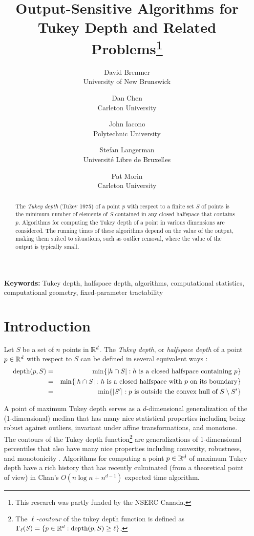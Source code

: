 \documentclass[12pt]{article}
\title{Output-Sensitive Algorithms for Tukey Depth and
        Related Problems\thanks{This research was partly funded by
	the NSERC Canada.}}
\author{David Bremner \\ University of New Brunswick \and
        Dan Chen \\ Carleton University \and
	John Iacono \\ Polytechnic University \and
	Stefan Langerman \\ Universit\'e Libre de Bruxelles \and
	Pat Morin \\ Carleton University}
\date{}
\DeclareMathOperator{\td}{depth}
\begin{document}
\maketitle

\begin{abstract}
The \emph{Tukey depth} (Tukey 1975) of a point $p$ with respect to a
finite set $S$ of points is the minimum number of elements of $S$
contained in any closed halfspace that contains $p$.  Algorithms for
computing the Tukey depth of a point in various dimensions are
considered. The running times of these algorithms depend on the value
of the output, making them suited to situations, such as outlier
removal, where the value of the output is typically small.
\end{abstract}

\noindent\textbf{Keywords:}
Tukey depth, halfspace depth, algorithms, computational statistics, 
computational geometry, fixed-parameter tractability

\section{Introduction}

Let $S$ be a set of $n$ points in $\mathbb{R}^d$.
The \emph{Tukey depth}, or \emph{halfspace depth} of a point $p\in\mathbb{R}^d$ with
respect to $S$ can be defined in several equivalent ways \cite{t75}:
\begin{eqnarray}
\td(p,S) & = & \min\{ |h\cap S| :
	             \mbox{$h$ is a closed halfspace containing $p$} \} 
                       \eqlabel{tuk-orig} \\ 
            & = & \min\{ |h\cap S| :
                      \mbox{$h$ is a closed halfspace 
                            with $p$ on its boundary} \} 
                        \eqlabel{tuk-boundary} \\ 
            & = & \min\{ |S'| :
                      \mbox{$p$ is outside the convex hull of 
                           $S\setminus S'$} \}
                      \eqlabel{tuk-hull}
\end{eqnarray}

A point of maximum Tukey depth serves as a $d$-dimensional
generalization of the (1-dimensional) median that has many nice
statistical properties including being robust against outliers,
invariant under affine transformations, and monotone.  The contours of
the Tukey depth function\footnote{The \emph{$\ell$-contour} of the
tukey depth function is defined as $\Gamma_\ell(S)=\{p\in\R^d :
\td(p,S)\ge \ell\}$.}  are generalizations of 1-dimensional
percentiles that also have many nice properties including convexity,
robustness, and monotonicity \cite{rr98,rr96,s90}.  Algorithms for
computing a point $p\in\mathbb{R}^d$ of maximum Tukey depth have a rich
history \cite{m91,ls03,c04} that has recently culminated (from a
theoretical point of view) in Chan's $O(n\log n + n^{d-1})$ expected
time algorithm.  
\end{document}

